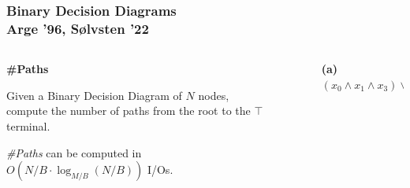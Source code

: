 \documentclass[english, aspectratio=169]{beamer}
\begin{document}
\begin{frame}
  \frametitle{Binary Decision Diagrams \\ Arge '96, S{\o}lvsten '22}

  \begin{columns}
    \begin{column}{0.5\linewidth}
      \textbf{\#Paths}

      Given a Binary Decision Diagram of $N$ nodes, compute the number of paths
      from the root to the $\top$ terminal.

      \vspace{20pt}
      \begin{theorem}
        \emph{\#Paths} can be computed in $O(N/B \cdot \log_{M/B}(N/B))$ I/Os.
      \end{theorem}

    \end{column}
    \begin{column}{0.5\linewidth}
      \begin{figure}
        \centering

        \begin{tikzpicture}[scale=0.8, every node/.style={transform shape}]
          
        \end{tikzpicture}

        \caption{\small \textbf{(a)} $(x_0 \wedge x_1 \wedge x_3) \vee (x_2 \oplus x_3)$}
      \end{figure}
    \end{column}
  \end{columns}
\end{frame}
\end{document}
